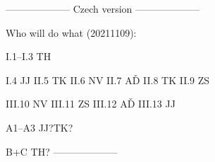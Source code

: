
--------------------
Czech version
--------------------

Who will do what (20211109):

I.1--I.3 TH
 
 I.4  JJ
II.5  TK
II.6  NV
II.7  AĎ
II.8  TK
II.9  ZS
 
III.10  NV
III.11  ZS
III.12  AĎ
III.13  JJ
 
A1--A3  JJ?TK?
 
B+C  TH?
--------------------

